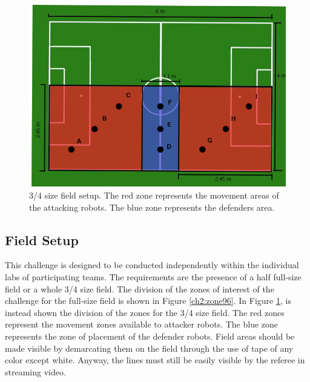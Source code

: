 \begin{figure}[ht]
\includegraphics[width=0.95\linewidth]{figs/ch_2_reduced.jpg}
\caption{3/4 size field setup. The red zone represents the movement areas of the attacking robots. The blue zone represents the defenders area.}
\label{ch2:zone64}
\centering
\end{figure}


\subsection{Field Setup}
This challenge is designed to be conducted independently within the individual labs of participating teams. The requirements are the presence of a half full-size field or a whole 3/4 size field. 
The division of the zones of interest of the challenge for the full-size field is shown in Figure \ref{ch2:zone96}. In Figure \ref{ch2:zone64}, is instead shown the division of the zones for the 3/4 size field.
The red zones represent the movement zones available to attacker robots. The blue zone represents the zone of placement of the defender robots.
Field areas should be made visible by demarcating them on the field through the use of tape of any color except white. Anyway, the lines must still be easily visible by the referee in streaming video.


